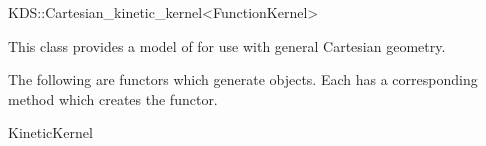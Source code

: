 

\begin{ccRefClass}{KDS::Cartesian_kinetic_kernel<FunctionKernel>}  %


\ccDefinition
  
This class provides a model of  for use with general Cartesian geometry.


\ccTypes





The following are functors which generate  objects. Each has a corresponding  method which creates the functor.















\ccIsModel

KineticKernel


\end{ccRefClass}


